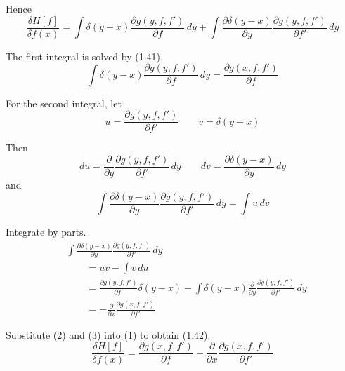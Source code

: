 \documentclass[12pt]{article}
\begin{document}
Hence
\begin{equation*}
\frac{\delta H[f]}{\delta f(x)}
=\int\delta(y-x)\frac{\partial g(y,f,f')}{\partial f}\,dy
+\int\frac{\partial\delta(y-x)}{\partial y}\frac{\partial g(y,f,f')}{\partial f'}\,dy
\tag{1}
\end{equation*}

The first integral is solved by (1.41).
\begin{equation*}
\int\delta(y-x)\frac{\partial g(y,f,f')}{\partial f}\,dy
=\frac{\partial g(x,f,f')}{\partial f}
\tag{2}
\end{equation*}

For the second integral, let
\begin{equation*}
u=\frac{\partial g(y,f,f')}{\partial f'}
\qquad
v=\delta(y-x)
\end{equation*}

Then
\begin{equation*}
du=\frac{\partial}{\partial y}\frac{\partial g(y,f,f')}{\partial f'}\,dy
\qquad
dv=\frac{\partial\delta(y-x)}{\partial y}\,dy
\end{equation*}
and
\begin{equation*}
\int\frac{\partial\delta(y-x)}{\partial y}\frac{\partial g(y,f,f')}{\partial f'}\,dy
=\int u\,dv
\end{equation*}

Integrate by parts.
\begin{align*}
&\int\frac{\partial\delta(y-x)}{\partial y}\frac{\partial g(y,f,f')}{\partial f'}\,dy
\\
&\qquad{}=uv-\int v\,du
\\
&\qquad{}=\frac{\partial g(y,f,f')}{\partial f'}\delta(y-x)
-\int\delta(y-x)\frac{\partial}{\partial y}\frac{\partial g(y,f,f')}{\partial f'}\,dy
\\
&\qquad{}=-\frac{\partial}{\partial x}\frac{\partial g(x,f,f')}{\partial f'}
\tag{3}
\end{align*}

Substitute (2) and (3) into (1) to obtain (1.42).
\begin{equation*}
\frac{\delta H[f]}{\delta f(x)}
=\frac{\partial g(x,f,f')}{\partial f}
-\frac{\partial}{\partial x}\frac{\partial g(x,f,f')}{\partial f'}
\end{equation*}
\end{document}
